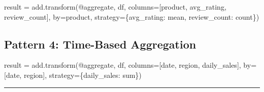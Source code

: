 \documentclass[
  letterpaper,
]{scrbook}
\newenvironment{Shaded}{\begin{snugshade}}{\end{snugshade}}
\newcommand{\NormalTok}[1]{\textcolor[rgb]{0.00,0.23,0.31}{#1}}
\newcommand{\OperatorTok}[1]{\textcolor[rgb]{0.37,0.37,0.37}{#1}}
\newcommand{\StringTok}[1]{\textcolor[rgb]{0.13,0.47,0.30}{#1}}
\begin{document}
\begin{Shaded}
\begin{Highlighting}[]
\NormalTok{result }\OperatorTok{=}\NormalTok{ add.transform(}\StringTok{\textquotesingle{}@aggregate\textquotesingle{}}\NormalTok{, df,}
\NormalTok{                       columns}\OperatorTok{=}\NormalTok{[}\StringTok{\textquotesingle{}product\textquotesingle{}}\NormalTok{, }\StringTok{\textquotesingle{}avg\_rating\textquotesingle{}}\NormalTok{, }\StringTok{\textquotesingle{}review\_count\textquotesingle{}}\NormalTok{],}
\NormalTok{                       by}\OperatorTok{=}\StringTok{\textquotesingle{}product\textquotesingle{}}\NormalTok{,}
\NormalTok{                       strategy}\OperatorTok{=}\NormalTok{\{}\StringTok{\textquotesingle{}avg\_rating\textquotesingle{}}\NormalTok{: }\StringTok{\textquotesingle{}mean\textquotesingle{}}\NormalTok{, }\StringTok{\textquotesingle{}review\_count\textquotesingle{}}\NormalTok{: }\StringTok{\textquotesingle{}count\textquotesingle{}}\NormalTok{\})}
\end{Highlighting}
\end{Shaded}

\subsection{Pattern 4: Time-Based
Aggregation}\label{pattern-4-time-based-aggregation}

\begin{Shaded}
\begin{Highlighting}[]
\NormalTok{result }\OperatorTok{=}\NormalTok{ add.transform(}\StringTok{\textquotesingle{}@aggregate\textquotesingle{}}\NormalTok{, df,}
\NormalTok{                       columns}\OperatorTok{=}\NormalTok{[}\StringTok{\textquotesingle{}date\textquotesingle{}}\NormalTok{, }\StringTok{\textquotesingle{}region\textquotesingle{}}\NormalTok{, }\StringTok{\textquotesingle{}daily\_sales\textquotesingle{}}\NormalTok{],}
\NormalTok{                       by}\OperatorTok{=}\NormalTok{[}\StringTok{\textquotesingle{}date\textquotesingle{}}\NormalTok{, }\StringTok{\textquotesingle{}region\textquotesingle{}}\NormalTok{],}
\NormalTok{                       strategy}\OperatorTok{=}\NormalTok{\{}\StringTok{\textquotesingle{}daily\_sales\textquotesingle{}}\NormalTok{: }\StringTok{\textquotesingle{}sum\textquotesingle{}}\NormalTok{\})}
\end{Highlighting}
\end{Shaded}

\begin{center}\rule{0.5\linewidth}{0.5pt}\end{center}
\end{document}

